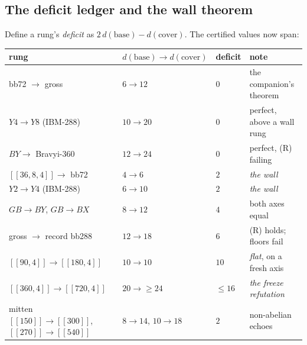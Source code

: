 \documentclass[11pt]{article}
\theoremstyle{plain}
\theoremstyle{definition}
\theoremstyle{remark}
\newcommand{\base}{\mathrm{base}}
\newcommand{\cov}{\mathrm{cover}}
\begin{document}
\subsection{The deficit ledger and the wall theorem}

Define a rung's \emph{deficit} as $2\,d(\base) - d(\cov)$. The certified
values now span:

\begin{center}
\small
\begin{tabular}{llll}
\toprule
rung & $d(\base) \to d(\cov)$ & deficit & note\\
\midrule
bb72 $\to$ gross & $6 \to 12$ & $0$ & the companion's theorem\\
$Y4 \to Y8$ (IBM-288) & $10 \to 20$ & $0$ & perfect, above a wall rung\\
$BY \to$ Bravyi-360 & $12 \to 24$ & $0$ & perfect, (R) failing\\
$[[36,8,4]] \to$ bb72 & $4 \to 6$ & $2$ & \emph{the wall}\\
$Y2 \to Y4$ (IBM-288) & $6 \to 10$ & $2$ & \emph{the wall}\\
$GB \to BY$, $GB \to BX$ & $8 \to 12$ & $4$ & both axes equal\\
gross $\to$ record bb288 & $12 \to 18$ & $6$ & (R) holds; floors fail\\
$[[90,4]] \to [[180,4]]$ & $10 \to 10$ & $10$ & \emph{flat}, on a fresh axis\\
$[[360,4]] \to [[720,4]]$ & $20 \to {\geq}24$ & $\leq 16$ & \emph{the freeze refutation}\\
mitten $[[150]]{\to}[[300]]$, $[[270]]{\to}[[540]]$ & $8 \to 14$,
$10 \to 18$ & $2$ & non-abelian echoes\\
\bottomrule
\end{tabular}
\end{center}
\end{document}
